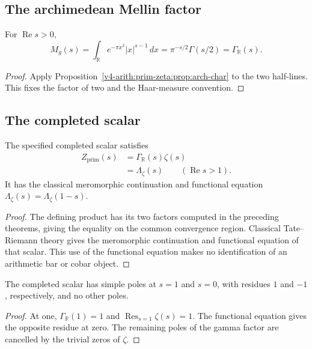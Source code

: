 \subsection{The archimedean Mellin factor}
\label{v4-arith:prim-zeta:arch-char}
\label{v4-arith:prim-zeta:att-2-mellin}
\begin{theorem}
\label{v4-arith:prim-zeta:thm:arch-char}
For \(\operatorname{Re}s>0\),
\begin{equation}
\label{v4-arith:prim-zeta:eq:full-arch-char}
 M_g(s)=\int_{\mathbb R}e^{-\pi x^2}|x|^{s-1}\,dx
        =\pi^{-s/2}\Gamma(s/2)=\Gamma_{\mathbb R}(s).
\end{equation}
\end{theorem}
\begin{proof}
Apply Proposition~\ref{v4-arith:prim-zeta:prop:arch-char} to the two half-lines.
This fixes the factor of two and the Haar-measure convention.
\end{proof}

\subsection{The completed scalar}
\label{v4-arith:prim-zeta:adelic-char}
\label{v4-arith:prim-zeta:main-theorem}
\label{v4-arith:prim-zeta:assembly}
\begin{theorem}
\label{v4-arith:prim-zeta:thm:main}
\label{v4-arith:prim-zeta:thm:adelic-char}
The specified completed scalar satisfies
\begin{align}
 Z_{\mathrm{prim}}(s)&=\Gamma_{\mathbb R}(s)\zeta(s)
 \label{v4-arith:prim-zeta:eq:main}\\
 &=\Lambda_\zeta(s)\qquad(\operatorname{Re}s>1).
 \label{v4-arith:prim-zeta:eq:adelic-char}
\end{align}
It has the classical meromorphic continuation and functional equation
\(\Lambda_\zeta(s)=\Lambda_\zeta(1-s)\).
\end{theorem}
\begin{proof}
The defining product has its two factors computed in the preceding
theorems, giving the equality on the common convergence region.
Classical Tate--Riemann theory gives the meromorphic continuation and
functional equation of that scalar. This use of the functional equation
makes no identification of an arithmetic bar or cobar object.
\end{proof}
\begin{corollary}
\label{v4-arith:prim-zeta:cor:primary-is-xi}
The completed scalar has simple poles at \(s=1\) and \(s=0\), with
residues \(1\) and \(-1\), respectively, and no other poles.
\end{corollary}
\begin{proof}
At one, \(\Gamma_{\mathbb R}(1)=1\) and
\(\operatorname{Res}_{s=1}\zeta(s)=1\). The functional equation gives
the opposite residue at zero. The remaining poles of the gamma factor
are cancelled by the trivial zeros of \(\zeta\).
\end{proof}

